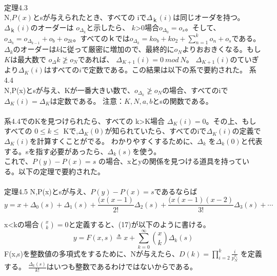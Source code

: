 \documentclass[20 pts]{article}
\begin{document}
\paragraph{}
定理4.3\\
N,$P(x)$とsが与えられたとき、すべての iで$\Delta_ｋ (i)$は同じオーダを持つ。$\Delta_ｋ (i)$のオーダーは $o_{\Delta_k}$と示したら、 $k$>0場合$o_{\Delta_0}= o_s$。そして、$o_{\Delta_k}=o_{\Delta_{k-1}}+o_b+o_{2k}$。すべてのｋでは$o_{\Delta_k}=ko_b+ko_2+\sum_{n=1}^k o_n  +o_s$である。$\Delta_k$のオーダーは$k$に従って厳密に増加ので、最終的に$o_N$よりおおきくなる。もし$K$は最大数で $o_Δk\ngeq o_N$であれば、 $\Delta_{K+1}(i)=0\ mod\ N$。 $\Delta_{K+1}(i)$のていぎより$\Delta_K(i)$はすべての$i$で定数である。この結果は以下の系で要約された。
系4.4\\
N,P(x)とsが与え、Kが一番大きい数で、$o_{\Delta_k}\ngeq o_N$の場合、すべてのiで $\Delta_K (i)= \Delta_K$は定数である。
注意：$K,N,a,b$とsの関数である。
\paragraph{}
系4.4でのKを見つけられたら、すべての k>K場合 $\Delta_K (i)=0$。その上、もしすべての $0\leq k\leq$ Kで,$\Delta_K (0) $が知られていたら、すべてのiで$\Delta_K (i)$の定義で $\Delta_K (i)$を計算すくことがでる。
わかりやすくするために、$\Delta_k$ を$\Delta_k (0)$と代表する。sを指す必要があったら、$\Delta_k(s)$を使う。\\これで、$P(y)-P(x)=s$ の場合、xとyの関係を見つける道具を持っている。以下の定理で要約された。
\paragraph{}
定理4.5
N,P(x)とsが与え、$P(y)-P(x)=s$であるならば
\begin{equation}\tag{17}
y=x+\Delta_0 (s) +\Delta_1 (s)+\frac{(x(x-1)}{2!} \Delta_2 (s)+\frac{(x(x-1)(x-2)}{3!} \Delta_3(s)+⋯		
\end{equation}	

x<kの場合${x \choose k}=0$と定義すると、(17)が以下のように書ける。
\begin{equation}\tag{18}
y=F(x,s)\triangleq x+\sum_{k=0}^\infty {x \choose k} \Delta_k (s)	
\end{equation}					
F(x,s)を整数値の多項式をするために、Nが与えたら、$D(k)=\prod_{i=2}^k \frac{i}{p_N^{o_i}}$ を定義する。
$\frac{\Delta_k(s)}{k!}$はいつも整数であるわけではないからである。
\end{document}
